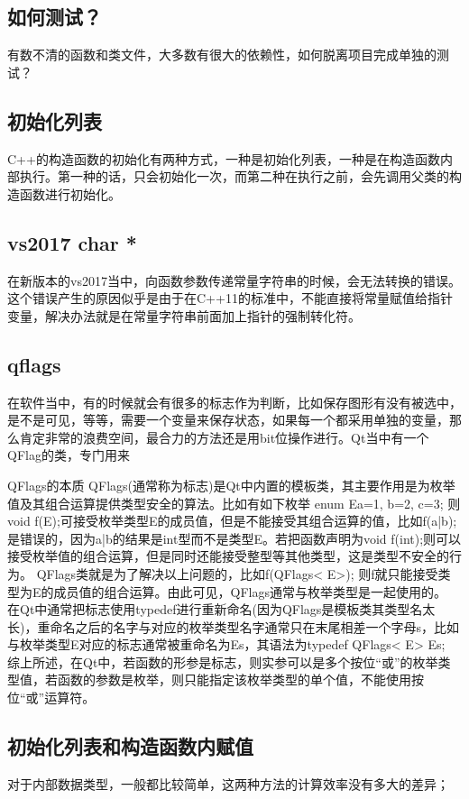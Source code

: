 \subsection{如何测试？}
有数不清的函数和类文件，大多数有很大的依赖性，如何脱离项目完成单独的测试？
\subsection{初始化列表}
C++的构造函数的初始化有两种方式，一种是初始化列表，一种是在构造函数内部执行。第一种的话，只会初始化一次，而第二种在执行之前，会先调用父类的构造函数进行初始化。
\subsection{vs2017 char *}
在新版本的vs2017当中，向函数参数传递常量字符串的时候，会无法转换的错误。这个错误产生的原因似乎是由于在C++11的标准中，不能直接将常量赋值给指针变量，解决办法就是在常量字符串前面加上指针的强制转化符。
\subsection{qflags}
在软件当中，有的时候就会有很多的标志作为判断，比如保存图形有没有被选中，是不是可见，等等，需要一个变量来保存状态，如果每一个都采用单独的变量，那么肯定非常的浪费空间，最合力的方法还是用bit位操作进行。Qt当中有一个QFlag的类，专门用来

QFlags的本质
QFlags(通常称为标志)是Qt中内置的模板类，其主要作用是为枚举值及其组合运算提供类型安全的算法。比如有如下枚举
enum E{a=1, b=2, c=3};
则void f(E);可接受枚举类型E的成员值，但是不能接受其组合运算的值，比如f(a|b);是错误的，因为a|b的结果是int型而不是类型E。若把函数声明为void f(int);则可以接受枚举值的组合运算，但是同时还能接受整型等其他类型，这是类型不安全的行为。
QFlags类就是为了解决以上问题的，比如f(QFlags< E>); 则f就只能接受类型为E的成员值的组合运算。由此可见，QFlags通常与枚举类型是一起使用的。
在Qt中通常把标志使用typedef进行重新命名(因为QFlags是模板类其类型名太长)，重命名之后的名字与对应的枚举类型名字通常只在末尾相差一个字母s，比如与枚举类型E对应的标志通常被重命名为Es，其语法为typedef QFlags< E> Es;
综上所述，在Qt中，若函数的形参是标志，则实参可以是多个按位“或”的枚举类型值，若函数的参数是枚举，则只能指定该枚举类型的单个值，不能使用按位“或”运算符。

\subsection{初始化列表和构造函数内赋值}
对于内部数据类型，一般都比较简单，这两种方法的计算效率没有多大的差异；

